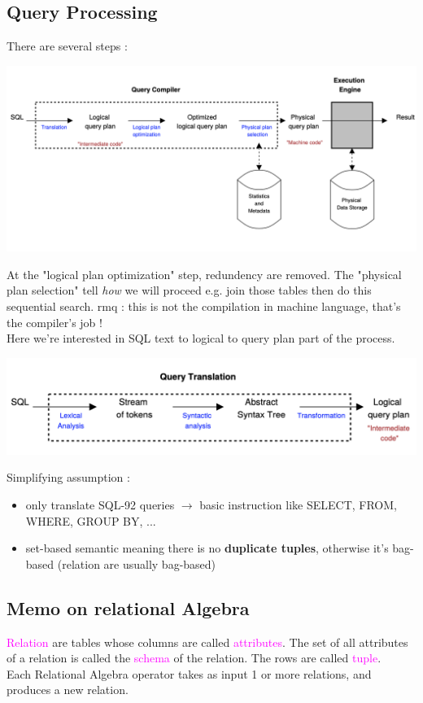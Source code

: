 \documentclass[12pt,a4paper]{article}
\begin{document}
\subsection{Query Processing}
There are several steps :
\begin{center}
	\includegraphics[scale=0.38]{img/img1.png}
\end{center}
At the "logical plan optimization" step, redundency are removed.
The "physical plan selection" tell \textit{how} we will proceed e.g. join those tables then do this sequential search. rmq : this is not the compilation in machine language, that's the compiler's job ! \\

Here we're interested in SQL text to logical to query plan part of the process.

\begin{center}
	\includegraphics[scale=0.42]{img/img2.png}
\end{center}

Simplifying assumption :
\begin{itemize}
\item only translate SQL-92 queries $\rightarrow$ basic instruction like SELECT, FROM, WHERE, GROUP BY, ...
\item set-based semantic meaning there is no \textbf{duplicate tuples}, otherwise it's bag-based (relation are usually bag-based)
\end{itemize}

\subsection{Memo on relational Algebra}
\textcolor{magenta}{Relation} are tables whose columns are called \textcolor{magenta}{attributes}. The set of all attributes of a relation is called the \textcolor{magenta}{schema} of the relation. The rows are called \textcolor{magenta}{tuple}.\\
Each Relational Algebra operator takes as input 1 or more relations, and produces a new relation.
\end{document}
